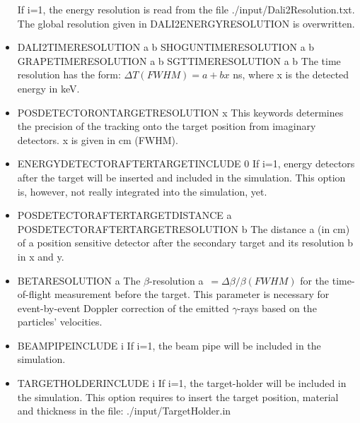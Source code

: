 \documentclass[12pt]{book}
\begin{document}
\begin{itemize}
  If i=1, the energy resolution is read from the file ./input/Dali2Resolution.txt. The global
  resolution given in DALI2ENERGYRESOLUTION is overwritten.
\item DALI2TIMERESOLUTION a b\hfill{} \linebreak
  SHOGUNTIMERESOLUTION a b\hfill{} \linebreak
  GRAPETIMERESOLUTION a b\hfill{} \linebreak
  SGTTIMERESOLUTION a b\hfill{} \linebreak
 The time resolution has the form: $\Delta T (FWHM) = a + bx$ ns, where x is the detected energy in keV.
\item POSDETECTORONTARGETRESOLUTION x\hfill{} \linebreak
  This keywords determines the precision of the tracking onto the target position from imaginary detectors. x is 
  given in cm (FWHM).
\item ENERGYDETECTORAFTERTARGETINCLUDE 0\hfill{} \linebreak
  If i=1, energy detectors after the target will be inserted and included in the simulation. This option is, however,
  not really integrated into the simulation, yet.
\item POSDETECTORAFTERTARGETDISTANCE a\hfill{} \linebreak
  POSDETECTORAFTERTARGETRESOLUTION b\hfill{} \linebreak
  The distance a (in cm) of a position sensitive detector after the secondary target and its resolution b in x and 
  y.
\item BETARESOLUTION a \hfill{} \linebreak
  The $\beta$-resolution a~$=\Delta \beta / \beta (FWHM)$ for the time-of-flight measurement before the target.
  This parameter is necessary for event-by-event Doppler correction of the emitted $\gamma$-rays based on the
  particles' velocities.
\item BEAMPIPEINCLUDE i\hfill{} \linebreak
  If i=1, the beam pipe will be included in the simulation.
\item TARGETHOLDERINCLUDE i\hfill{} \linebreak
  If i=1, the target-holder will be included in the simulation. This option requires to insert the target 
  position, material and thickness in the file:
\linebreak
\linebreak
{\ttfamily ./input/TargetHolder.in}
\linebreak

\end{itemize}
\end{document}
